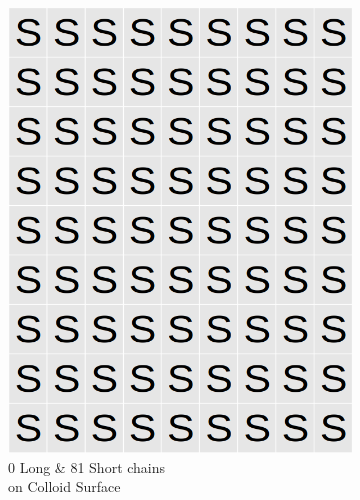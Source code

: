 \documentclass[journal=jacsat,manuscript=article]{achemso}
\begin{document}
\begin{figure}[H]
    \begin{subfigure}[b]{0.4\textwidth}
        \includegraphics[scale=0.15]{fig8a.png}
        \caption{0 Long \& 81 Short chains\\ on Colloid Surface}
        \label{fig:A}
    \end{subfigure}
    \begin{subfigure}[b]{0.4\textwidth}

\end{subfigure}
\end{figure}
\end{document}
